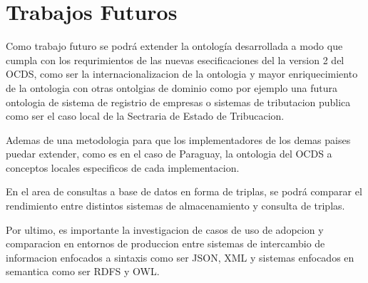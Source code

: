 \section{Trabajos Futuros}
\label{chap:futuros}

Como trabajo futuro se podrá extender la ontología desarrollada a modo que cumpla con los requrimientos de las nuevas esecificaciones del la version 2 del OCDS, como ser la internacionalizacion de la ontologia y mayor enriquecimiento de la ontologia con otras ontolgias de dominio como por ejemplo una futura ontologia de sistema de registrio de empresas o sistemas de tributacion publica como ser el caso local de la Sectraria de Estado de Tribucacion. 

Ademas de una metodologia para que los implementadores de los demas paises puedar extender, como es en el caso de Paraguay, la ontologia del OCDS a conceptos locales especificos de cada implementacion.

En el area de consultas a base de datos en forma de triplas, se podrá comparar el rendimiento entre distintos sistemas de almacenamiento y consulta de triplas.

Por ultimo, es importante la investigacion de casos de uso de adopcion y comparacion en entornos de produccion entre sistemas de intercambio de informacion enfocados a sintaxis como ser JSON, XML y sistemas enfocados en semantica como ser RDFS y OWL. 
